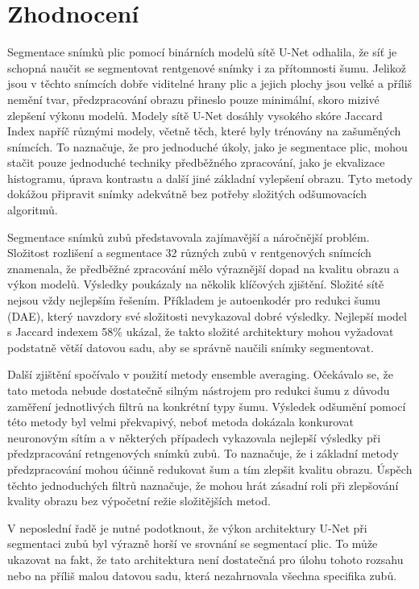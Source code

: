 \documentclass[male,czech,api_ing]{thesis}
\begin{document}
\chapter{Zhodnocení} 
Segmentace snímků plic pomocí binárních modelů sítě U-Net odhalila, že síť je schopná naučit se segmentovat rentgenové snímky i za přítomnosti šumu. Jelikož jsou v těchto snímcích dobře viditelné hrany plic a jejich plochy jsou velké a příliš nemění tvar, předzpracování obrazu přineslo pouze minimální, skoro mizivé zlepšení výkonu modelů. Modely sítě U-Net dosáhly vysokého skóre Jaccard Index napříč různými modely, včetně těch, které byly trénovány na zašuměných snímcích. To naznačuje, že pro jednoduché úkoly, jako je segmentace plic, mohou stačit pouze jednoduché techniky předběžného zpracování, jako je ekvalizace histogramu, úprava kontrastu a další jiné základní vylepšení obrazu. Tyto metody dokážou připravit snímky adekvátně bez potřeby složitých odšumovacích algoritmů.

Segmentace snímků zubů představovala zajímavější a náročnější problém. Složitost rozlišení a segmentace 32 různých zubů v rentgenových snímcích znamenala, že předběžné zpracování mělo výraznější dopad na kvalitu obrazu a výkon modelů. Výsledky poukázaly na několik klíčových zjištění. Složité sítě nejsou vždy nejlepším řešením. Příkladem je autoenkodér pro redukci šumu (DAE), který navzdory své složitosti nevykazoval dobré výsledky. Nejlepší model s Jaccard indexem 58\% ukázal, že takto složité architektury mohou vyžadovat podstatně větší datovou sadu, aby se správně naučili snímky segmentovat.

Další zjištění spočívalo v použití metody ensemble averaging. Očekávalo se, že tato metoda nebude dostatečně silným nástrojem pro redukci šumu z důvodu zaměření jednotlivých filtrů na konkrétní typy šumu. Výsledek odšumění pomocí této metody byl velmi překvapivý, neboť metoda dokázala konkurovat neuronovým sítím a v některých případech vykazovala nejlepší výsledky při předzpracování retngenových snímků zubů. To naznačuje, že i základní metody předzpracování mohou účinně redukovat šum a tím zlepšit kvalitu obrazu. Úspěch těchto jednoduchých filtrů naznačuje, že mohou hrát zásadní roli při zlepšování kvality obrazu bez výpočetní režie složitějších metod. 

V neposlední řadě je nutné podotknout, že výkon architektury U-Net při segmentaci zubů byl výrazně horší ve srovnání se segmentací plic. To může ukazovat na fakt, že tato architektura není dostatečná pro úlohu tohoto rozsahu nebo na příliš malou datovou sadu, která nezahrnovala všechna specifika zubů.
\end{document}
